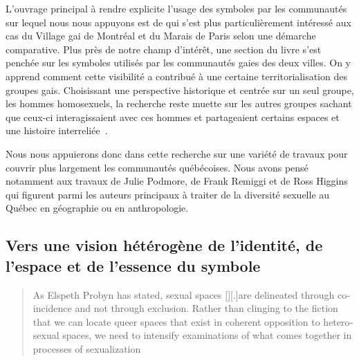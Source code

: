 L'ouvrage principal à rendre explicite l'usage des symboles par les communautés \lgbt{} sur lequel nous nous appuyons est  de \citet{Giraud2014} qui s'est plus particulièrement intéressé aux cas du Village gai de Montréal et du Marais de Paris selon une démarche comparative. 
Plus près de notre champ d'intérêt, une section du livre s'est penchée sur les symboles utilisés par les communautés gaies des deux villes. 
On y apprend comment cette visibilité a contribué à une certaine territorialisation des groupes gais. 
Choisissant une perspective historique et centrée sur un seul groupe, les hommes homosexuels, la recherche reste muette sur les autres groupes \lgbt{} sachant que ceux-ci interagissaient avec ces hommes et partageaient certains espaces et une histoire interreliée~\citep{Remiggi2000,Demczuk1998,Podmore2001,Higgins1997,Higgins1999}.

Nous nous appuierons donc dans cette recherche sur une variété de travaux pour couvrir plus largement les communautés \lgbt{} québécoises. 
Nous avons pensé notamment aux travaux de Julie Podmore, de Frank Remiggi et de Ross Higgins qui figurent parmi les auteurs principaux à traiter de la diversité sexuelle au Québec en géographie ou en anthropologie.

\subsection{Vers une vision hétérogène de l'identité, de l'espace et de l'essence du symbole}
\label{sec:vers_une_vision_h_t_rog_ne_de_l_identit_de_l_espace_et_de_l_essence_du_symbole}
 \foreignblockquote{english}[{\cite[tel que cité
  dans][97]{Oswin2008}}][.]{As Elspeth Probyn has stated, sexual spaces [{\citeyear[10]{Probyn1996}}][.]{are delineated through coincidence and not through exclusion}. Rather than clinging to the fiction that we can locate queer spaces that exist in coherent opposition to heterosexual spaces, we need to intensify examinations of what comes together in processes of sexualization}

